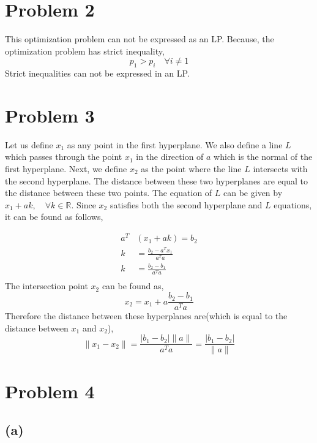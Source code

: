 \documentclass[]{report}
\begin{document}
\chapter{Problem 2} 

This optimization problem can not be expressed as an LP. Because, the optimization problem has strict inequality, 
\begin{equation}
	p_1 > p_i \quad \forall i \neq 1
\end{equation}
Strict inequalities can not be expressed in an LP.

\chapter{Problem 3}

Let us define $x_1$ as any point in the first hyperplane. We also define a line $L$ which passes through the point $x_1$ in the direction of $a$ which is the normal of the first hyperplane. Next, we define $x_2$ as the point where the line $L$ intersects with the second hyperplane. The distance between these two hyperplanes are equal to the distance between these two points. The equation of $L$ can be given by $x_1 + ak, \quad \forall k \in \mathbb{R}$. Since $x_2$ satisfies both the second hyperplane and $L$ equations, it can be found as follows,

\begin{equation}
	\begin{split}
	a^T&(x_1+ak) = b_2 \\
	k &= \frac{b_2-a^Tx_1}{a^Ta} \\
	k &= \frac{b_2-b_1}{a^Ta} \\
	\end{split}
\end{equation}
The intersection point $x_2$ can be found as,
\begin{equation}
	x_2 = x_1 + a\frac{b_2-b_1}{a^Ta}
\end{equation}
Therefore the distance between these hyperplanes are(which is equal to the distance between $x_1$ and $x_2$),
\begin{equation}
	\|x_1 - x_2\| = \frac{|b_1 - b_2|\|a\|}{a^Ta} = \frac{|b_1 - b_2|}{\|a\|}
\end{equation}

\chapter{Problem 4}

\section*{(a)}
\end{document}
